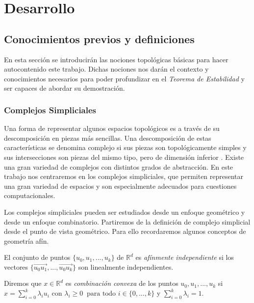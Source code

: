 \chapter{Desarrollo}

\section{Conocimientos previos y definiciones}
En esta sección se introducirán las nociones topológicas básicas para hacer autocontenido este trabajo. Dichas nociones nos darán el contexto y conocimientos necesarios para poder profundizar en el \emph{Teorema de Estabilidad} y ser capaces de abordar su demostración.

\subsection{Complejos Simpliciales}
Una forma de representar algunos espacios topológicos es a través de su descomposición en piezas más sencillas. Una descomposición de estas características se denomina complejo si sus piezas son topológicamente simples y sus intersecciones son piezas del mismo tipo, pero de dimensión inferior \cite{libroEH}. Existe una gran variedad de complejos con distintos grados de abstracción. En este trabajo nos centraremos en los complejos simpliciales, que permiten representar una gran variedad de espacios y son especialmente adecuados para cuestiones computacionales.

Los complejos simpliciales pueden ser estudiados desde un enfoque geométrico y desde un enfoque combinatorio. Partiremos de la definición de complejo simplicial desde el punto de vista geométrico. Para ello recordaremos algunos conceptos de geometría afín.

\begin{definition}
El conjunto de puntos $\{u_0, u_1, ..., u_k\}$ de $\mathbb{R}^d$ es \emph{afínmente independiente} si los vectores $\{\overrightarrow{u_0u_1}, ..., \overrightarrow{u_0u_k}\}$ son linealmente independientes.
\end{definition}

\begin{definition}
\begin{sloppypar}
Diremos que $x \in \mathbb{R}^d$ es \emph{combinación convexa} de los puntos ${u_0, u_1, ..., u_k}$ si $x = \sum_{i=0}^{k} \lambda_i u_i$ con $\lambda_i \geq 0 \ \text{ para todo } i \in \{0,...,k\}$ y $\sum_{i=0}^{k} \lambda_i = 1$.
\end{sloppypar}
\end{definition}

